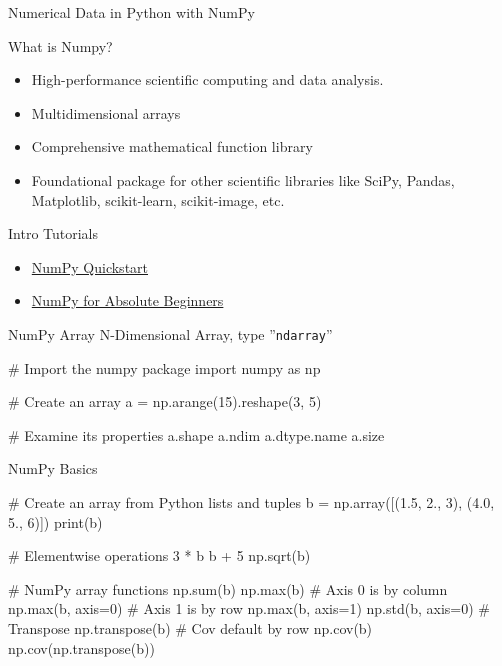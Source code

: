 \documentclass[ignorenonframetext,xcolor=x11names]{beamer}
\begin{document}
\begin{frame}{Numerical Data in Python with NumPy}
\begin{block}{What is Numpy?}
\begin{itemize}
    \item High-performance scientific computing and data analysis.    
    \item Multidimensional arrays
    \item Comprehensive mathematical function library
    \item Foundational package for other scientific libraries like SciPy, Pandas, Matplotlib, scikit-learn, scikit-image, etc.
\end{itemize}
\end{block}

\begin{block}{Intro Tutorials}
\begin{itemize}
\item \href{https://numpy.org/doc/stable/user/quickstart.html}{NumPy Quickstart} \\ 

\item \href{https://numpy.org/doc/stable/user/absolute_beginners.html}{NumPy for Absolute Beginners}
\end{itemize}
\end{block}
\end{frame}

\begin{frame}[fragile]{NumPy Array}
N-Dimensional Array, type ''\texttt{ndarray}'' \\

\begin{pythoncode}
# Import the numpy package
import numpy as np

# Create an array
a = np.arange(15).reshape(3, 5)

# Examine its properties
a.shape
a.ndim
a.dtype.name
a.size
\end{pythoncode}
\end{frame}

\begin{frame}[fragile]{NumPy Basics}

\begin{pythoncode}
# Create an array from Python lists and tuples
b = np.array([(1.5, 2., 3), 
              (4.0, 5., 6)])
print(b)

# Elementwise operations
3 * b
b + 5
np.sqrt(b)

# NumPy array functions
np.sum(b)
np.max(b)
# Axis 0 is by column
np.max(b, axis=0)
# Axis 1 is by row
np.max(b, axis=1)
np.std(b, axis=0)
# Transpose
np.transpose(b)
# Cov default by row
np.cov(b)
np.cov(np.transpose(b))
\end{pythoncode}
\end{frame}
\end{document}
